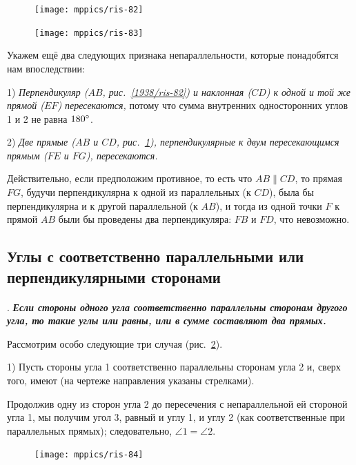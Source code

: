 \documentclass[oneside]{book}
\begin{document}
{

\begin{figure}
\centering
\texttt{[image: mppics/ris-82]}
\caption{}\label{1938/ris-82}
\bigskip
\texttt{[image: mppics/ris-83]}
\caption{}\label{1938/ris-83}
\end{figure}

Укажем ещё два следующих признака непараллельности, которые понадобятся нам впоследствии:

1) \emph{Перпендикуляр \emph{($AB$, рис.~\ref{1938/ris-82})} и наклонная \emph{($CD$)} к одной и той же прямой \emph{($EF$)} пересекаются,} потому что сумма внутренних односторонних углов 1 и 2 не равна $180\degree$.

2) \emph{Две прямые \emph{($AB$ и $CD$, рис.~\ref{1938/ris-83}),} перпендикулярные к двум пересекающимся прямым \emph{($FE$ и $FG$),} пересекаются.}

Действительно, если предположим противное, то есть
что $AB \parallel CD$, то прямая $FG$, будучи перпендикулярна к одной из параллельных (к $CD$), была бы перпендикулярна и к другой параллельной (к $AB$), и тогда из одной точки $F$ к прямой $AB$ были бы проведены два перпендикуляра:
$FB$ и $FD$, что невозможно.

}

\subsection*{Углы с соответственно параллельными или перпендикулярными сторонами}

\paragraph{}\label{1938/79}
.
\textbf{\emph{Если стороны одного угла соответственно параллельны сторонам другого угла, то такие углы или равны, или в сумме составляют два прямых.}}

Рассмотрим особо следующие три случая (рис.~\ref{1938/ris-84}).

1) Пусть стороны угла 1 соответственно параллельны сторонам угла 2 и, сверх того, имеют  (на чертеже направления указаны стрелками).

Продолжив одну из сторон угла 2 до пересечения с непараллельной ей стороной угла 1, мы получим угол 3, равный и углу 1, и углу 2 (как соответственные при параллельных прямых);
следовательно, $\angle 1 = \angle 2$.

\begin{figure}
\vskip-4mm
\centering
\texttt{[image: mppics/ris-84]}
\caption{}\label{1938/ris-84}
\end{figure}
\end{document}
